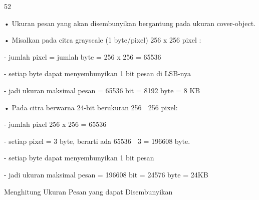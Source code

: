 \documentclass{article}
\begin{document}

52

• Ukuran pesan yang akan disembunyikan bergantung pada ukuran cover-object.

• Misalkan pada citra grayscale (1 byte/pixel) 256 x 256 pixel :

 - jumlah pixel = jumlah byte = 256 x 256 = 65536

 - setiap byte dapat menyembunyikan 1 bit pesan di LSB-nya

 - jadi ukuran maksimal pesan = 65536 bit = 8192 byte = 8 KB

• Pada citra berwarna 24-bit berukuran 256  256 pixel:

 - jumlah pixel 256 x 256 = 65536

 - setiap pixel = 3 byte, berarti ada 65536  3 = 196608 byte. 

 - setiap byte dapat menyembunyikan 1 bit pesan

 - jadi ukuran maksimal pesan = 196608 bit = 24576 byte = 24KB

Menghitung Ukuran Pesan yang dapat Disembunyikan
\end{document}
